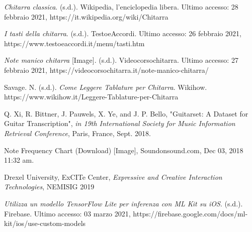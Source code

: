 \documentclass[12pt,a4paper]{book}
\begin{document}
    
    \begin{thebibliography}{100}  %
    
     \textit{Chitarra classica}. (s.d.). Wikipedia, l'enciclopedia libera. Ultimo accesso: 28 febbraio 2021, https://it.wikipedia.org/wiki/Chitarra
    
     \textit{I tasti della chitarra}. (s.d.). TestoeAccordi. Ultimo accesso: 26 febbraio 2021, https://www.testoeaccordi.it/menu/tasti.htm
    
     \textit{Note manico chitarra} [Image]. (s.d.). Videocorsochitarra. Ultimo accesso: 27 febbraio 2021, https://videocorsochitarra.it/note-manico-chitarra/
    
     Savage. N. (s.d.). \textit{Come Leggere Tablature per Chitarra}. Wikihow. https://www.wikihow.it/Leggere-Tablature-per-Chitarra
    	
     Q. Xi, R. Bittner, J. Pauwels, X. Ye, and J. P. Bello, "Guitarset: A Dataset for Guitar Transcription", \emph{in 19th International Society for Music Information Retrieval Conference}, Paris, France, Sept. 2018.
    
     Note Frequency Chart (Download) [Image], Soundonsound.com, Dec 03, 2018 11:32 am.
    
     Drexel University, ExCITe Center, \emph{Expressive and Creative Interaction Technologies}, NEMISIG 2019
    
     \textit{Utilizza un modello TensorFlow Lite per inferenza con ML Kit su iOS}. (s.d.). Firebase. Ultimo accesso: 03 marzo 2021, https://firebase.google.com/docs/ml-kit/ios/use-custom-models

	\end{thebibliography}
\end{document}
